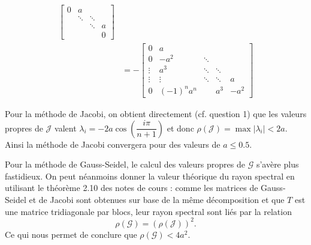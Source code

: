 \begin{align*}
  \begin{bmatrix}
    0 & a & &\\
      & \ddots &  \ddots &\\
      &  & \ddots  & a \\
      & &  & 0
  \end{bmatrix}\\
  & = -
  \begin{bmatrix}
    0 & a & & &\\
    0 & -a^2 & \ddots  & &\\
    \vdots & a^3 & \ddots & \ddots  &\\
    \vdots & \vdots & \ddots & \ddots  & a \\
    0 & (-1)^n a^n & & a^3 & -a^2
  \end{bmatrix}
\end{align*}

Pour la méthode de Jacobi, on obtient directement (cf. question 1) que les valeurs propres de $\mathcal{J}$ valent
$\lambda _i = -2a \cos(\dfrac{i \pi}{n+1})$ et donc $\rho(\mathcal{J}) = \max |\lambda_i| < 2a$.
Ainsi la méthode de Jacobi convergera pour des valeurs de $a \leq 0.5$. 

Pour la méthode de Gauss-Seidel, le calcul des valeurs propres de $\mathcal{G}$ s'avère plus fastidieux. On peut néanmoins donner la valeur théorique du rayon spectral en utilisant le théorème 2.10 des notes de cours : comme les matrices de Gauss-Seidel et de Jacobi sont obtenues sur base de la même décomposition et que $T$ est une matrice tridiagonale par blocs, leur rayon spectral sont liés par la relation $$\rho (\mathcal{G}) = (\rho (\mathcal{J}))^2 .$$
Ce qui nous permet de conclure que $\rho (\mathcal{G}) < 4a^2$.


